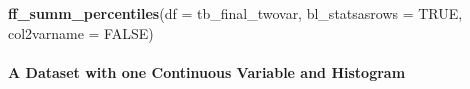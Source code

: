 \documentclass[
]{book}
\newenvironment{Shaded}{\begin{snugshade}}{\end{snugshade}}
\newcommand{\DataTypeTok}[1]{\textcolor[rgb]{0.13,0.29,0.53}{#1}}
\newcommand{\KeywordTok}[1]{\textcolor[rgb]{0.13,0.29,0.53}{\textbf{#1}}}
\newcommand{\NormalTok}[1]{#1}
\newcommand{\OtherTok}[1]{\textcolor[rgb]{0.56,0.35,0.01}{#1}}
\begin{document}
\begin{Shaded}
\begin{Highlighting}[]
\KeywordTok{ff\_summ\_percentiles}\NormalTok{(}\DataTypeTok{df =}\NormalTok{ tb\_final\_twovar, }\DataTypeTok{bl\_statsasrows =} \OtherTok{TRUE}\NormalTok{, }\DataTypeTok{col2varname =} \OtherTok{FALSE}\NormalTok{)}
\end{Highlighting}
\end{Shaded}

\hypertarget{a-dataset-with-one-continuous-variable-and-histogram}{%
\paragraph{A Dataset with one Continuous Variable and Histogram}\label{a-dataset-with-one-continuous-variable-and-histogram}}
\end{document}
